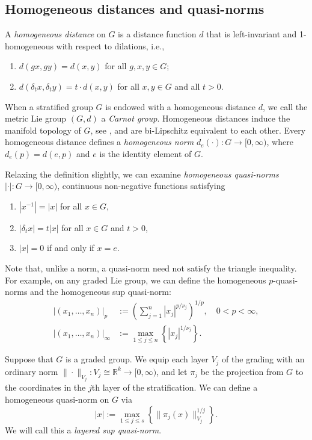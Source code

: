 \documentclass{article}
\theoremstyle{definition}
\newcommand{\norm}[1]{\|#1\|}
\newcommand{\inv}{^{-1}}
\newcommand{\R}{{\mathbb R}}
\begin{document}


\subsection{Homogeneous distances and quasi-norms}\label{subsec:quasi-norms}

A \emph{homogeneous distance} on $G$ is a distance function $d$ that is left-invariant and 1-homogeneous with respect to dilations, i.e., 
\begin{enumerate}
\item[(i)]
$d(gx,gy)=d(x,y)$ for all $g,x,y\in G$;
\item[(ii)]
$d(\delta_t x,\delta_t y) = t\cdot d(x,y)$ for all $x,y\in G$ and all $t>0$.
\end{enumerate}

When a stratified group $G$ is endowed with a homogeneous distance $d$, we call the metric Lie group $(G,d)$ a \emph{Carnot group}.
Homogeneous distances induce the manifold topology of  $G$, see \cite[Proposition 2.26]{MR3943324}, and are bi-Lipschitz equivalent to each other.
Every homogeneous distance defines a \emph{homogeneous norm}  $d_e(\cdot): G \to [0, \infty)$, where $d_e(p) = d(e, p)$ and $e$ is the identity element of $G$.

Relaxing the definition slightly, we can examine {\em homogeneous quasi-norms} $|\cdot|: G \to [0,\infty)$, continuous non-negative functions satisfying
\begin{enumerate}
\item $|x\inv| = |x|$ for all $x \in G$,
\item $|\delta_t x| = t|x|$ for all $x \in G$ and $t >0$,
\item $|x| = 0$ if and only if $x = e$.
\end{enumerate}

Note that, unlike a norm, a quasi-norm need not satisfy the triangle inequality. For example, on any graded Lie group, we can define the homogeneous $p$-quasi-norms and the homogeneous sup quasi-norm:
\begin{align*}
|(x_1, \ldots, x_n)|_p & := \left(\sum_{j=1}^n |x_j|^{p/\nu_j}\right)^{1/p}, \quad 0<p<\infty,\\
|(x_1, \ldots, x_n)|_\infty & := \max_{1\leq j\leq n}\left\{ |x_j|^{1/\nu_j}\right \}.
\end{align*}

Suppose that $G$ is a graded group. We equip each layer $V_j$ of the grading with an ordinary norm $\norm{\cdot}_{V_j}: V_j \cong \R^k \to [0, \infty)$, and let $\pi_j$ be the projection from $G$ to the coordinates in the $j$th layer of the stratification. We can define a homogeneous quasi-norm on $G$ via
\[
|x| := \max_{1\leq j \leq s} \left\{\norm{\pi_j(x)}_{V_j}^{1/j}\right \}.
\]
We will call this a {\em layered sup quasi-norm}.
\end{document}
